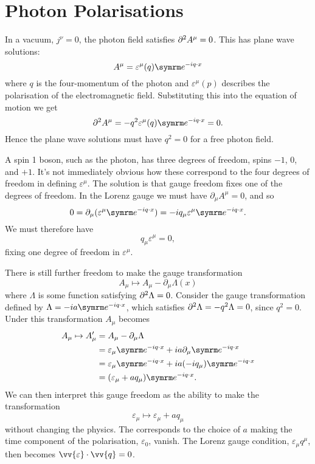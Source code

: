 \section{Photon Polarisations}
In a vacuum, \(j^\nu = 0\), the photon field satisfies \(\partial^2 A^\mu = 0\).
This has plane wave solutions:
\begin{equation}
    A^\mu = \varepsilon^\mu(q) \e^{-iq\cdot x}
\end{equation}
where \(q\) is the four-momentum of the photon and \(\varepsilon^\mu(p)\) describes the polarisation of the electromagnetic field.
Substituting this into the equation of motion we get
\begin{equation}
    \dalembertian A^\mu = -q^2\varepsilon^\mu(q)\e^{-iq\cdot x} = 0.
\end{equation}
Hence the plane wave solutions must have \(q^2 = 0\) for a free photon field.

A spin 1 boson, such as the photon, has three degrees of freedom, spins \(-1\), \(0\), and \(+1\).
It's not immediately obvious how these correspond to the four degrees of freedom in defining \(\varepsilon^\mu\).
The solution is that gauge freedom fixes one of the degrees of freedom.
In the Lorenz gauge we must have \(\partial_\mu A^\mu = 0\), and so
\begin{equation}
    0 = \partial_\mu (\varepsilon^\mu \e^{-iq\cdot x}) = -iq_\mu\varepsilon^\mu\e^{-iq \cdot x}.
\end{equation}
We must therefore have
\begin{equation}
    q_\mu \varepsilon^\mu = 0,
\end{equation}
fixing one degree of freedom in \(\varepsilon^\mu\).

There is still further freedom to make the gauge transformation
\begin{equation}
    A_\mu \mapsto A_\mu - \partial_\mu \Lambda(x)
\end{equation}
where \(\Lambda\) is some function satisfying \(\partial^2\Lambda = 0\).
Consider the gauge transformation defined by \(\Lambda = -ia\e^{-iq \cdot x}\), which satisfies \(\partial^2\Lambda = -q^2\Lambda = 0\), since \(q^2 = 0\).
Under this transformation \(A_\mu\) becomes
\begin{align}
    A_\mu \mapsto A'_\mu &= A_\mu - \partial_\mu\Lambda\\
    &= \varepsilon_\mu \e^{-iq\cdot x} + ia\partial_\mu\e^{-iq\cdot x}\\
    &= \varepsilon_\mu \e^{-iq\cdot x} + ia(-iq_\mu)\e^{-iq\cdot x}\\
    &= (\varepsilon_\mu + aq_\mu)\e^{-iq\cdot x}.
\end{align}
We can then interpret this gauge freedom as the ability to make the transformation
\begin{equation}
    \varepsilon_\mu \mapsto \varepsilon_\mu + aq_\mu
\end{equation}
without changing the physics.
The  corresponds to the choice of \(a\) making the time component of the polarisation, \(\varepsilon_0\), vanish.
The Lorenz gauge condition, \(\varepsilon_\mu q^\mu\), then becomes \(\vv{\varepsilon} \cdot \vv{q} = 0\).

